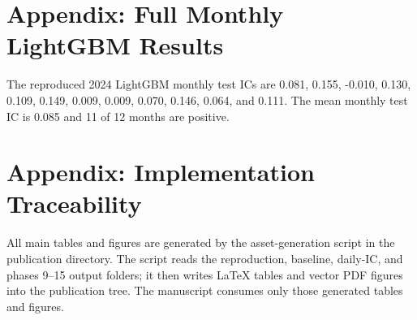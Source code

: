 \documentclass[11pt,a4paper]{article}
\begin{document}
\appendix

\section{Appendix: Full Monthly LightGBM Results}

The reproduced 2024 LightGBM monthly test ICs are 0.081, 0.155, -0.010,
0.130, 0.109, 0.149, 0.009, 0.009, 0.070, 0.146, 0.064, and 0.111.  The mean
monthly test IC is 0.085 and 11 of 12 months are positive.

\section{Appendix: Implementation Traceability}

All main tables and figures are generated by the asset-generation script in
the publication directory.  The script reads the reproduction, baseline,
daily-IC, and phases 9--15 output folders; it then writes LaTeX tables and
vector PDF figures into the publication tree.  The manuscript consumes only
those generated tables and figures.


\end{document}
